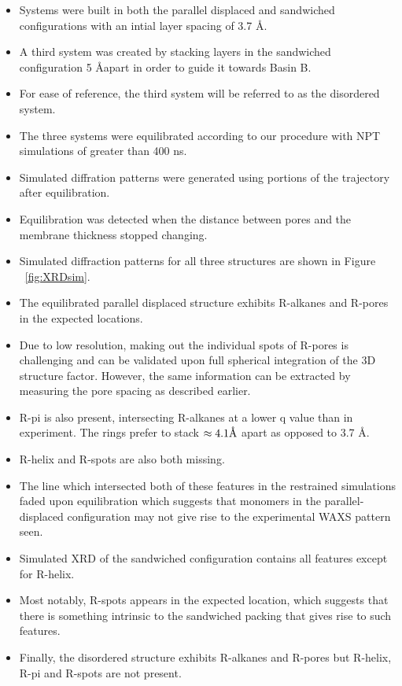 \documentclass{article}
\newcommand{\angstrom}{\textup{\AA}}
\begin{document}
  \begin{itemize}
  	\item Systems were built in both the parallel displaced and sandwiched 
	configurations with an intial layer spacing of 3.7 \angstrom.
	\item A third system was created by stacking layers in the sandwiched 
	configuration 5 \angstrom apart in order to guide it towards Basin B.
	\item For ease of reference, the third system will be referred to as the disordered system. %
	\item The three systems were equilibrated according to our procedure with
	NPT simulations of greater than 400 ns.
	\item Simulated diffration patterns were generated using portions of the
	trajectory after equilibration.
	\item Equilibration was detected when the distance between pores and the 
	membrane thickness stopped changing.
	\item Simulated diffraction patterns for all three structures are shown in 
	Figure ~\ref{fig:XRDsim}. 
	\item The equilibrated parallel displaced structure exhibits R-alkanes and
	R-pores in the expected locations. 
	\item Due to low resolution, making out the individual spots of R-pores is
	challenging and can be validated upon full spherical integration of the 3D 
	structure factor. However, the same information can be extracted by measuring 
	the pore spacing as described earlier.
	\item R-pi is also present, intersecting R-alkanes at a lower q value than
	in experiment. The rings prefer to stack $\approx 4.1 \angstrom$ apart as 
	opposed to 3.7 \angstrom.
	\item R-helix and R-spots are also both missing.
	\item The line which intersected both of these features in the restrained 
	simulations faded upon equilibration which suggests that monomers in the 
	parallel-displaced configuration may not give rise to the experimental WAXS 
	pattern seen.
	\item Simulated XRD of the sandwiched configuration contains all features 
	except for R-helix.
	\item Most notably, R-spots appears in the expected location, which suggests 
	that there is something intrinsic to the sandwiched packing that gives rise 
	to such features. 
	\item Finally, the disordered structure exhibits R-alkanes and R-pores but 
	R-helix, R-pi and R-spots are not present.
  \end{itemize}
  
\end{document}
